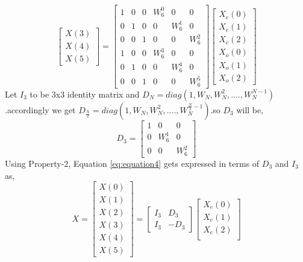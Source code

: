 \documentclass[journal,12pt,twocolumn]{IEEEtran}
\renewcommand\thesection{\arabic{section}}
\begin{document}
\begin{enumerate}[label=\thesection.\arabic*.,ref=\thesection.\theenumi]
\begin{equation}
\begin{bmatrix}
X(3) \\ 
X(4) \\ 
X(5) 
\end{bmatrix}
=
\begin{bmatrix}
1 & 0 & 0 & W^{0}_{6} & 0 & 0\\
0 & 1 & 0 &  0 & W^{1}_{6} & 0\\
0 & 0 & 1 & 0 & 0 & W^{2}_{6}\\
1 & 0 & 0 & W^{3}_{6} & 0 & 0\\
0 & 1 & 0 & 0 & W^{4}_{6} & 0\\
0 & 0 & 1 & 0 & 0 & W^{5}_{6}
\end{bmatrix}
\begin{bmatrix}
X_{e}(0) \\ 
X_{e}(1) \\ 
X_{e}(2) \\ 
X_{o}(0) \\ 
X_{o}(1) \\ 
X_{o}(2)
\end{bmatrix}
\label{eq:equation4}
\end{equation}
Let $I_{3}$ to be 3x3 identity matrix and $D_{N} = diag(1,W_{N},W_{N}^{2},....,W_{N}^{N-1})$ .accordingly we get  $D_{\frac{N}{2}} = diag(1,W_{N},W_{N}^{2},....,W_{N}^{\frac{N}{2} -1})$.so  $D_{3}$ will be,
\begin{equation}
D_{3}=
\begin{bmatrix}
1 & 0 & 0 \\
0 & W^{1}_{6} & 0 \\
0 & 0 & W^{2}_{6}
\end{bmatrix}
\end{equation}
Using Property-2, Equation \eqref{eq:equation4} gets expressed  in terms of   $D_{3}$ and $I_{3}$ as,
\begin{equation}
X
=
\begin{bmatrix}
X(0) \\ 
X(1) \\ 
X(2) \\ 
X(3) \\ 
X(4) \\ 
X(5) 
\end{bmatrix}
=
\begin{bmatrix}
I_{3} & D_{3} \\
I_{3} & -D_{3}
\end{bmatrix}
\begin{bmatrix}
X_{e}(0) \\ 
X_{e}(1) \\ 
X_{e}(2) \\ 

\end{bmatrix}
\end{equation}
\end{enumerate}
\end{document}
